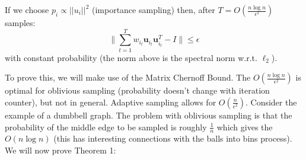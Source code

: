 \documentclass[11pt]{article}
\newcommand{\bu}{\mathbf{u}}
\begin{document}
\begin{theorem}
If we choose $p_i \propto ||u_i||^2$ (importance sampling) then, after $T = O(\frac{n \log n}{\epsilon^2})$ samples:
\[
    \bigg\| \sum_{t=1}^T w_{i_t} \bu_{i_t}\bu_{i_t}^T - I\bigg\| \leq \epsilon
\]
with constant probability (the norm above is the spectral norm w.r.t. $\ell_2$).
\end{theorem}
To prove this, we will make use of the Matrix Chernoff Bound. The $O(\frac{n\log n}{\epsilon^2})$ is optimal for oblivious sampling (probability doesn't change with iteration counter), but not in general. Adaptive sampling allows for $O(\frac{n}{\epsilon^2})$. Consider the example of a dumbbell graph. The problem with oblivious sampling is that the probability of the middle edge to be sampled is roughly $\frac{1}{n}$ which gives the $O(n\log n)$ (this has interesting connections with the balls into bins process). We will now prove Theorem 1:
\end{document}
